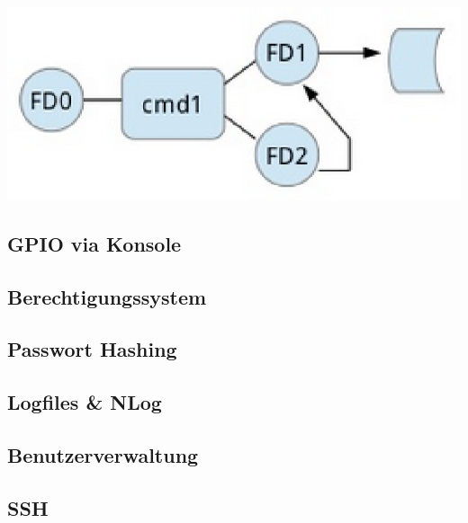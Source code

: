 \documentclass[
  9pt,
  a4paperpaper,
  DIV=11]{scrartcl}
\newenvironment{Shaded}{}{}
\newcommand{\NormalTok}[1]{\textcolor[rgb]{0.14,0.16,0.18}{#1}}
\numberwithin{equation}{section}
\begin{document}
\begin{multicols}{2}
\begin{Shaded}
\end{Shaded}

\includegraphics{images/RedirectedERR.png}

\hypertarget{gpio-via-konsole}{%
\subsection{GPIO via Konsole}\label{gpio-via-konsole}}

\hypertarget{berechtigungssystem}{%
\subsection{Berechtigungssystem}\label{berechtigungssystem}}

\hypertarget{passwort-hashing}{%
\subsection{Passwort Hashing}\label{passwort-hashing}}

\hypertarget{logfiles-nlog}{%
\subsection{Logfiles \& NLog}\label{logfiles-nlog}}

\hypertarget{benutzerverwaltung}{%
\subsection{Benutzerverwaltung}\label{benutzerverwaltung}}

\hypertarget{ssh}{%
\subsection{SSH}\label{ssh}}


\end{multicols}
\end{document}
